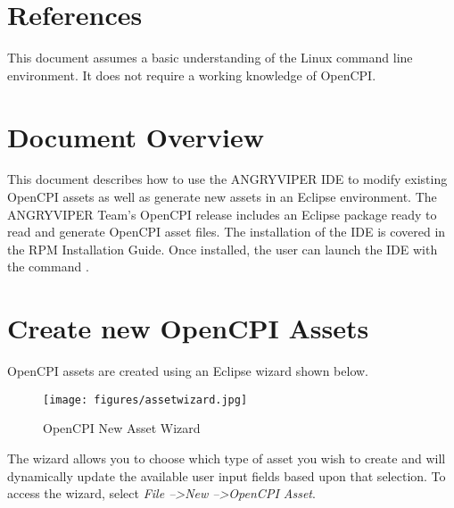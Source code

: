 \newpage

\tableofcontents

\newpage

\listoffigures

\newpage

\listoftables

\newpage

\section{References}

This document assumes a basic understanding of the Linux command line environment. It does not require a working knowledge of OpenCPI.
\def\refcapbottom{}

\newpage

\section{Document Overview}
\label{sec:doc_overview}
\begin{flushleft}
This document describes how to use the ANGRYVIPER IDE to modify existing OpenCPI assets as well as generate new assets in an Eclipse environment. The ANGRYVIPER Team's OpenCPI release includes an Eclipse package ready to read and generate OpenCPI asset files. The installation of the IDE is covered in the RPM Installation Guide. Once installed, the user can launch the IDE with the command .
\end{flushleft}

\section{Create new OpenCPI Assets}
\label{sec:create_assets}
\begin{flushleft}

OpenCPI assets are created using an Eclipse wizard shown below. \newline
\begin{figure}[h!]
  \centering
  \texttt{[image: figures/assetwizard.jpg]}
  \caption{OpenCPI New Asset Wizard}
  \label{fig:figure1}
\end{figure}

The wizard allows you to choose which type of asset you wish to create and will dynamically update the available user input fields based upon that selection.  To access the wizard, select \textit{File --\textgreater New --\textgreater OpenCPI Asset}.

\end{flushleft}

